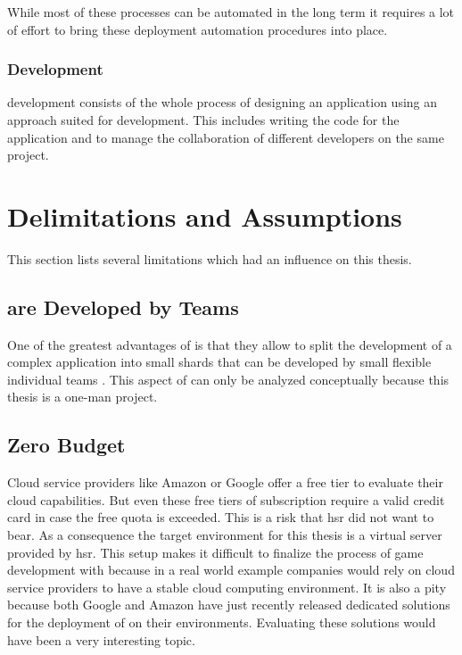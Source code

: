 While most of these processes can be automated in the long term it requires a
lot of effort to bring these deployment automation procedures into place.

\subsubsection{\ms{} Development}

\ms{} development consists of the whole process of designing an application
using an approach suited for \ms{} development. This includes writing the code
for the application and to manage the collaboration of different developers on
the same project.

\section{Delimitations and Assumptions}

This section lists several limitations which had an influence on this
thesis.

\subsection{\mss{} are Developed by Teams}
One of the greatest advantages of \mss{} is that they allow to split the
development of a complex application into small shards that can be developed by
small flexible individual teams \cite{anderson2017teams}. This aspect of \mss{}
can only be analyzed conceptually because this thesis is a one-man project.

\subsection{Zero Budget}
\label{sub:zero_buget}
Cloud service providers like Amazon or Google offer a free tier to evaluate
their cloud capabilities. But even these free tiers of subscription require a
valid credit card in case the free quota is exceeded. This is a risk that
\gls{hsr} did not want to bear. As a consequence the target environment for this
thesis is a virtual server provided by \gls{hsr}. This setup makes it difficult
to finalize the process of game development with \mss{} because in a real world
example companies would rely on cloud service providers to have a stable cloud
computing environment. It is also a pity because both Google and Amazon have
just recently released dedicated solutions for the deployment of \ogs{} on their
environments. Evaluating these solutions would have been a very interesting
topic.

